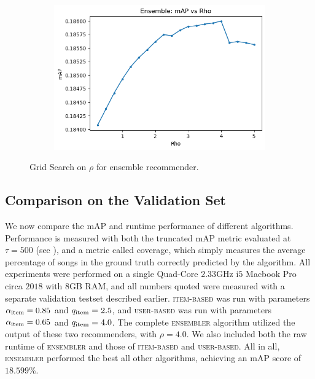 \documentclass[conference]{IEEEtran}
\newcommand{\mAP}{m\textsc{AP} }
\begin{document}
\begin{figure}[htbp]
\centering
\begin{subfigure}{0.85\columnwidth}
  \centering
  \includegraphics[width=\columnwidth]{rho-grid-search.png}
\end{subfigure}
\caption{Grid Search on $\rho$ for ensemble recommender.}
\label{fig:rho-grid-search}
\end{figure}

\subsection{Comparison on the Validation Set}

We now compare the \mAP and runtime performance of different algorithms.
Performance is measured with both the truncated \mAP metric evaluated at
$\tau=500$ (see \cite{Bertin-Mahieux2011}), and a
metric called coverage,
which simply measures the average percentage of songs in the
ground truth correctly predicted by the algorithm.
All experiments were performed on a single Quad-Core $2.33$GHz i$5$
Macbook Pro
circa $2018$ with $8$GB RAM, and all numbers quoted were measured with
a separate validation testset described earlier. \textsc{item-based} was
run with parameters $\alpha_{\rm item} = 0.85$ and $q_{\rm item} = 2.5$, and
\textsc{user-based} was
run with parameters $\alpha_{\rm item} = 0.65$ and $q_{\rm item} = 4.0$. The
complete \textsc{ensembler} algorithm utilized the output of these two 
recommenders, with $\rho = 4.0$. 
We also included both the raw runtime of \textsc{ensembler} and those of
\textsc{item-based} and \textsc{user-based}. All in all, \textsc{ensembler}
performed the best all other algorithms, achieving an \mAP score of
$18.599\%$.
\end{document}
